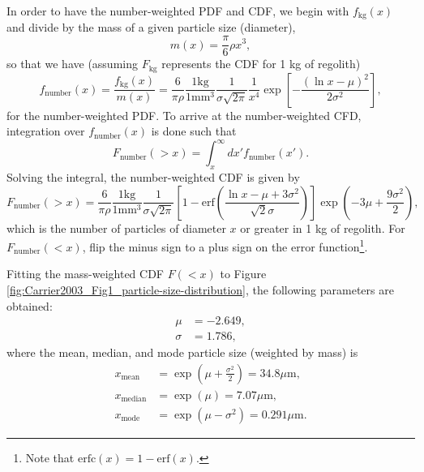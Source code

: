 \documentclass{article}
\begin{document}
In order to have the number-weighted PDF and CDF, we begin with $f_{\text{kg}}(x)$ and divide by the mass of a given particle size (diameter), \citep[e.g., Equation (7) of~][]{koschny2001impacts_mass}
\begin{equation}
m(x) = \frac{\pi}{6}\rho x^3,
\end{equation}
so that we have (assuming $F_{\text{kg}}$ represents the CDF for 1 kg of regolith)
\begin{equation}
f_{\text{number}}(x) = \frac{f_{\text{kg}}(x)}{m(x)} = \frac{6}{\pi\rho}\frac{1 \text{kg}}{1 \text{mm}^3}\frac{1}{\sigma\sqrt{2\pi}}
\frac{1}{x^4}\exp\left[-\frac{(\ln x - \mu)^2}{2\sigma^2}\right],
\end{equation}
for the number-weighted PDF. To arrive at the number-weighted CFD, integration over $f_{\text{number}}(x)$ is done such that
\begin{equation}
F_{\text{number}}(>x) = \int_{x}^{\infty}dx' f_{\text{number}}(x').
\end{equation}
Solving the integral, the number-weighted CDF is given by
\begin{equation}\label{eq:number_CFD_regolith}
F_{\text{number}}(>x) = \frac{6}{\pi\rho}\frac{1 \text{kg}}{1 \text{mm}^3}\frac{1}{\sigma\sqrt{2\pi}}
\left[1 - \text{erf}\left(\frac{\ln x - \mu + 3\sigma^2}{\sqrt{2}\sigma}\right)\right]\exp\left(-3\mu + \frac{9\sigma^2}{2}\right),
\end{equation}
which is the number of particles of diameter $x$ or greater in 1 kg of regolith. For $F_{\text{number}}(<x)$, flip the minus sign to a plus sign on the error function\footnote{Note that $\text{erfc}(x) = 1- \text{erf}(x)$.}.

Fitting the mass-weighted CDF $F(<x)$ to Figure \ref{fig:Carrier2003_Fig1_particle-size-distribution}, the following parameters are obtained:
\begin{align}
\mu &= -2.649,\\
\sigma &= 1.786,
\end{align}
where the mean, median, and mode particle size (weighted by mass) is
\begin{align}
x_{\text{mean}} &= \exp\left(\mu + \frac{\sigma^2}{2}\right) = 34.8 \text{$\mu$m},\\
x_{\text{median}} &= \exp(\mu) = 7.07 \text{$\mu$m},\\
x_{\text{mode}} &=  \exp\left(\mu - \sigma^2\right) = 0.291 \text{$\mu$m}.
\end{align}
\end{document}
